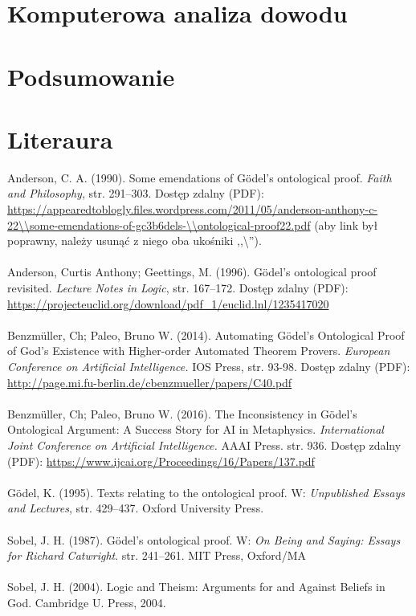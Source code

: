 \documentclass[12pt]{article}
\begin{document}
\begin{multicols}{2}
\section{Komputerowa analiza dowodu}


\section{Podsumowanie} \label{sec:summary}



\newpage
\section*{Literaura}

\noindent [Anderson, 1990] Anderson, C. A. (1990). Some emendations of G\"odel’s ontological proof. \textit{Faith and Philosophy}, str. 291–303. Dostęp zdalny (PDF): \url{https://appearedtoblogly.files.wordpress.com/2011/05/anderson-anthony-c-22\\some-emendations-of-gc3b6dels-\\ontological-proof22.pdf} (aby link był poprawny, należy usunąć z niego oba ukośniki ,,\textbackslash''). 
\\ \\
\noindent [Anderson, 1996] Anderson, Curtis Anthony; Geettings, M. (1996). G\"odel’s ontological proof revisited. \textit{Lecture Notes in Logic}, str. 167–172. Dostęp zdalny (PDF): \url{https://projecteuclid.org/download/pdf_1/euclid.lnl/1235417020}
\\ \\
 Benzm\"uller, Ch; Paleo, Bruno W. (2014). Automating G\"odel’s Ontological Proof of God’s Existence with Higher-order Automated Theorem Provers. \textit{European Conference on Artificial Intelligence.} IOS Press, str. 93-98. Dostęp zdalny (PDF): \url{http://page.mi.fu-berlin.de/cbenzmueller/papers/C40.pdf}
\\ \\
 Benzm\"uller, Ch; Paleo, Bruno W. (2016). The Inconsistency in G\"odel's Ontological Argument: A Success Story for AI in Metaphysics. \textit{International Joint Conference on Artificial Intelligence.} AAAI Press. str. 936. Dostęp zdalny (PDF): \url{https://www.ijcai.org/Proceedings/16/Papers/137.pdf}
\\ \\ 
\noindent [G\"odel, 1995] G\"odel, K. (1995). Texts relating to the ontological proof. W: \textit{Unpublished Essays and Lectures}, str. 429–437. Oxford University Press. 
\\ \\ 
\noindent [Sobel, 1987] Sobel, J. H. (1987). G\"odel’s ontological proof. W: \textit{On Being and Saying: Essays for Richard Catwright}. str. 241–261. MIT Press, Oxford/MA
\\ \\ 
\noindent [Sobel, 2004] Sobel, J. H. (2004). Logic and Theism: Arguments for and Against Beliefs in God. Cambridge U. Press, 2004.

\end{multicols}
\end{document}

